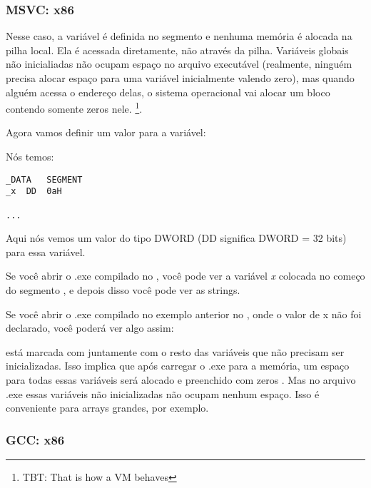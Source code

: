 \subsubsection{MSVC: x86}



Nesse caso, a variável  é definida no segmento  e nenhuma memória é alocada na pilha local.
Ela é acessada diretamente, não através da pilha.
Variáveis globais não inicialiadas não ocupam espaço no arquivo executável 
(realmente, ninguém precisa alocar espaço para uma variável inicialmente valendo zero), 
mas quando alguém acessa o endereço delas, o sistema operacional vai alocar um bloco contendo somente zeros nele.
\footnote{\ac{TBT}: That is how a \ac{VM} behaves}.

Agora vamos definir um valor para a variável:



Nós temos:

\begin{lstlisting}[style=customasmx86]
_DATA	SEGMENT
_x	DD	0aH

...
\end{lstlisting}

Aqui nós vemos um valor  do tipo DWORD (DD significa DWORD = 32 bits) para essa variável.

Se você abrir o .exe compilado no \IDA, você pode ver a variável \emph{x} colocada no começo do segmento ,
e depois disso você pode ver as strings.

Se você abrir o .exe compilado no exemplo anterior no \IDA, onde o valor de x não foi declarado, você poderá ver algo assim:



\label{BSSClearedByCStd}
 está marcada com  juntamente com o resto das variáveis que não precisam ser inicializadas.
Isso implica que após carregar o .exe para a memória, um espaço para todas essas variáveis será alocado e preenchido com zeros .
Mas no arquivo .exe essas variáveis não inicializadas não ocupam nenhum espaço.
Isso é conveniente para arrays grandes, por exemplo.



\subsubsection{GCC: x86}


